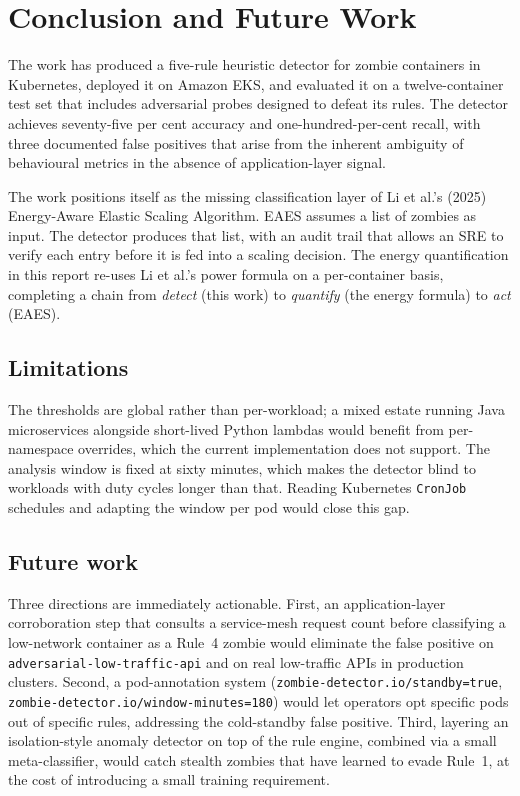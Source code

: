 \documentclass[11pt,a4paper,oneside]{article}
\begin{document}
\section{Conclusion and Future Work}
\label{sec:conclusion}

The work has produced a five-rule heuristic detector for zombie
containers in Kubernetes, deployed it on Amazon EKS, and evaluated it
on a twelve-container test set that includes adversarial probes designed
to defeat its rules. The detector achieves seventy-five per cent
accuracy and one-hundred-per-cent recall, with three documented false
positives that arise from the inherent ambiguity of behavioural metrics
in the absence of application-layer signal.

The work positions itself as the missing classification layer of
Li et al.'s (2025) Energy-Aware Elastic Scaling Algorithm. EAES assumes
a list of zombies as input. The detector produces that list, with an
audit trail that allows an SRE to verify each entry before it is fed
into a scaling decision. The energy quantification in this report
re-uses Li et al.'s power formula on a per-container basis, completing a
chain from \emph{detect} (this work) to \emph{quantify} (the energy
formula) to \emph{act} (EAES).

\subsection{Limitations}

The thresholds are global rather than per-workload; a mixed estate
running Java microservices alongside short-lived Python lambdas would
benefit from per-namespace overrides, which the current implementation
does not support. The analysis window is fixed at sixty minutes, which
makes the detector blind to workloads with duty cycles longer than that.
Reading Kubernetes \texttt{CronJob} schedules and adapting the window
per pod would close this gap.

\subsection{Future work}

Three directions are immediately actionable. First, an
application-layer corroboration step that consults a service-mesh
request count before classifying a low-network container as a Rule~4
zombie would eliminate the false positive on
\texttt{adversarial-low-traffic-api} and on real low-traffic APIs in
production clusters. Second, a pod-annotation system
(\texttt{zombie-detector.io/standby=true},
\texttt{zombie-detector.io/window-minutes=180}) would let operators
opt specific pods out of specific rules, addressing the cold-standby
false positive. Third, layering an isolation-style anomaly detector on
top of the rule engine, combined via a small meta-classifier, would
catch stealth zombies that have learned to evade Rule~1, at the cost of
introducing a small training requirement.
\end{document}
